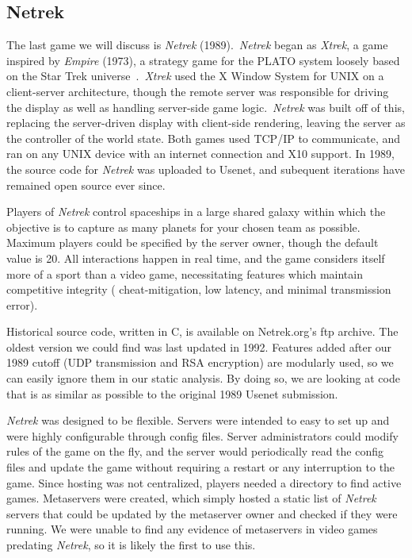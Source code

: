 \subsection{Netrek}\label{subsec:netrek}

The last game we will discuss is \textit{Netrek} (1989).\ \textit{Netrek} began as \textit{Xtrek}, a game inspired by \textit{Empire} (1973), a strategy game for the PLATO system loosely based on the Star Trek universe~\cite{netrekhist}.\ \textit{Xtrek} used the X Window System for UNIX on a client-server architecture, though the remote server was responsible for driving the display as well as handling server-side game logic.\ \textit{Netrek} was built off of this, replacing the server-driven display with client-side rendering, leaving the server as the controller of the world state. Both games used TCP/IP to communicate, and ran on any UNIX device with an internet connection and X10 support. In 1989, the source code for \textit{Netrek} was uploaded to Usenet, and subequent iterations have remained open source ever since.

Players of \textit{Netrek} control spaceships in a large shared galaxy within which the objective is to capture as many planets for your chosen team as possible. Maximum players could be specified by the server owner, though the default value is 20. All interactions happen in real time, and the game considers itself more of a sport than a video game, necessitating features which maintain competitive integrity (\eg{} cheat-mitigation, low latency, and minimal transmission error).

Historical source code, written in C, is available on Netrek.org's ftp archive. The oldest version we could find was last updated in 1992. Features added after our 1989 cutoff (UDP transmission and RSA encryption) are modularly used, so we can easily ignore them in our static analysis. By doing so, we are looking at code that is as similar as possible to the original 1989 Usenet submission.

\textit{Netrek} was designed to be flexible. Servers were intended to easy to set up and were highly configurable through config files. Server administrators could modify rules of the game on the fly, and the server would periodically read the config files and update the game without requiring a restart or any interruption to the game. Since hosting was not centralized, players needed a directory to find active games. Metaservers were created, which simply hosted a static list of \textit{Netrek} servers that could be updated by the metaserver owner and checked if they were running. We were unable to find any evidence of metaservers in video games predating \textit{Netrek}, so it is likely the first to use this.

